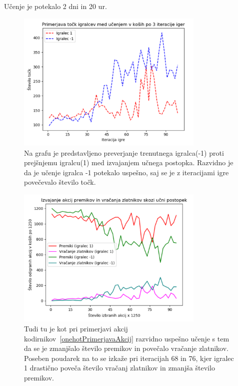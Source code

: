 \documentclass[a4paper, 12pt]{book}
\begin{document}
Učenje je potekalo 2 dni in 20 ur.
\begin{figure}[h!]
	\begin{center}
		\includegraphics[width=0.8\textwidth]{photos/learn_plot.pdf}
	\end{center}
	\caption{Na grafu je predstavljeno preverjanje trenutnega igralca(-1) proti prejšnjemu igralcu(1) med izvajanjem učnega postopka.
		Razvidno je da je učenje igralca -1 potekalo uspešno, saj se je z iteracijami igre povečevalo število točk.}
	\label{learn_plot}
\end{figure}

\begin{figure}[h!]
	\begin{center}
		\includegraphics[width=0.8\textwidth]{photos/return_move_learn.pdf}
	\end{center}
	\caption{Tudi tu je kot pri primerjavi akcij kodirnikov~\ref{onehotPrimerjavaAkcij} razvidno uspešno učenje s tem da se je zmanjšalo število premikov in povečalo vračanje zlatnikov.
		Poseben poudarek na to se izkaže pri iteracijah 68 in 76, kjer igralec 1 drastično poveča število vračanj zlatnikov in zmanjša število premikov.}
	\label{return_move_learn}
\end{figure}
\end{document}
